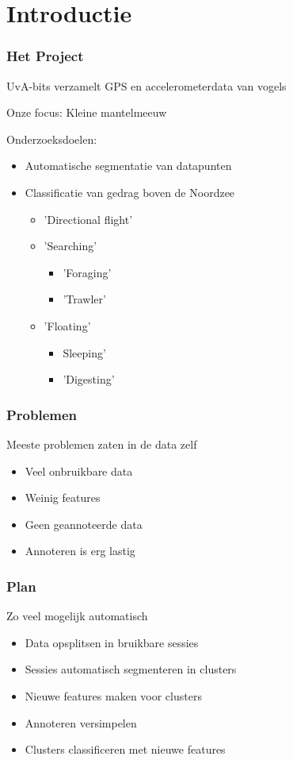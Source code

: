 \documentclass{beamer}
\title{\projectName}
\subtitle{\projectAbbreviation}
\author{Jesse Eisses, Sosha Happel, Maarten Inja and Maarten de Waard}
\institute{UvA}
\newcommand{\slide}[2]
{
\begin{frame}
\frametitle{#1} 

#2

\end{frame}
}
\begin{document}
\begin{frame}
\titlepage
\end{frame}



\section{Introductie}
\slide{Het Project}
{
UvA-bits verzamelt GPS en accelerometerdata van vogels

Onze focus: Kleine mantelmeeuw
\vspace{0.5cm}

Onderzoeksdoelen:
\begin{itemize}
	\item Automatische segmentatie van datapunten
	\item Classificatie van gedrag boven de Noordzee
	\begin{itemize}
		\item 'Directional flight'
		\item 'Searching'
		\begin{itemize}
			\item 'Foraging'
			\item 'Trawler'
		\end{itemize}
		\item 'Floating'
		\begin{itemize}
			\item Sleeping'
			\item 'Digesting'
		\end{itemize}

	\end{itemize}
\end{itemize} 
}

\slide{Problemen}
{
Meeste problemen zaten in de data zelf
\begin{itemize}
	\item Veel onbruikbare data
	\item Weinig features
	\item Geen geannoteerde data
	\item Annoteren is erg lastig
\end{itemize} 
}

\slide{Plan}
{
Zo veel mogelijk automatisch
\begin{itemize}
	\item Data opsplitsen in bruikbare sessies
	\item Sessies automatisch segmenteren in clusters
	\item Nieuwe features maken voor clusters
	\item Annoteren versimpelen
	\item Clusters classificeren met nieuwe features
\end{itemize} 
}
\end{document}
